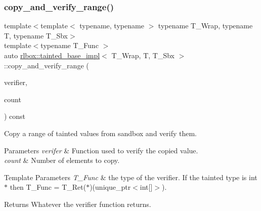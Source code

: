 \subsubsection{\texorpdfstring{copy\+\_\+and\+\_\+verify\+\_\+range()}{copy\_and\_verify\_range()}}
{\footnotesize\ttfamily template$<$template$<$ typename, typename $>$ typename T\+\_\+\+Wrap, typename T, typename T\+\_\+\+Sbx$>$ \\
template$<$typename T\+\_\+\+Func $>$ \\
auto \hyperlink{classrlbox_1_1tainted__base__impl}{rlbox\+::tainted\+\_\+base\+\_\+impl}$<$ T\+\_\+\+Wrap, T, T\+\_\+\+Sbx $>$\+::copy\+\_\+and\+\_\+verify\+\_\+range (\begin{DoxyParamCaption}\item[{T\+\_\+\+Func}]{verifier,  }\item[{std\+::size\+\_\+t}]{count }\end{DoxyParamCaption}) const\hspace{0.3cm}{\ttfamily [inline]}}



Copy a range of tainted values from sandbox and verify them. 


\begin{DoxyParams}{Parameters}
{\em verifer} & Function used to verify the copied value. \\
\hline
{\em count} & Number of elements to copy. \\
\hline
\end{DoxyParams}

\begin{DoxyTemplParams}{Template Parameters}
{\em T\+\_\+\+Func} & the type of the verifier. If the tainted type is {\ttfamily int$\ast$} then {\ttfamily T\+\_\+\+Func = T\+\_\+\+Ret($\ast$)(unique\+\_\+ptr$<$int\mbox{[}\mbox{]}$>$)}. \\
\hline
\end{DoxyTemplParams}
\begin{DoxyReturn}{Returns}
Whatever the verifier function returns. 
\end{DoxyReturn}
\mbox{\label{classrlbox_1_1tainted__base__impl_aa377cc4d0ea6768ada5032234ac89aab}} 
